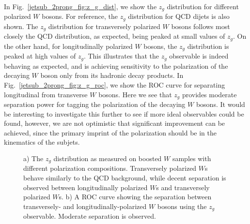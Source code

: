 \documentclass[11pt]{cernrep}
\begin{document}
In Fig.~\ref{jetsub_2prong_fig:z_g_dist}, we show the $z_g$ distribution for different polarized $W$ bosons.
%
For reference, the $z_g$ distribution for QCD dijets is also shown.
%
The $z_g$ distribution for transversely polarized $W$ bosons follows most closely the QCD distribution, as expected, being peaked at small values of $z_g$.
%
On the other hand, for longitudinally polarized $W$ bosons, the $z_g$ distribution is peaked at high values of $z_g$.
%
This illustrates that the $z_g$ observable is indeed behaving as expected, and is achieving sensitivity to the polarization of the decaying $W$ boson only from its hadronic decay products.
%
In Fig.~\ref{jetsub_2prong_fig:z_g_roc}, we show  the ROC curve for separating longitudinal from transverse $W$ bosons.
%
Here we see that $z_g$ provides moderate separation power for tagging the polarization of the decaying $W$ bosons.
%
It would be interesting to investigate this further to see if more ideal observables could be found, however, we are not optimistic that significant improvement can be achieved, since the primary imprint of the polarization should be in the kinematics of the subjets.

\begin{figure}
\begin{center}
\end{center}
\caption{a) The $z_g$ distribution as measured on boosted $W$ samples with different polarization compositions. Transversely polarized $W$s behave similarly to the QCD background, while decent separation is observed between longitudinally polarized $W$s and transversely polarized $W$s. b) A ROC curve showing the separation between transversely- and longitudinally-polarized $W$ bosons using the $z_g$ observable. Moderate separation is observed.}
\end{figure}
\end{document}
